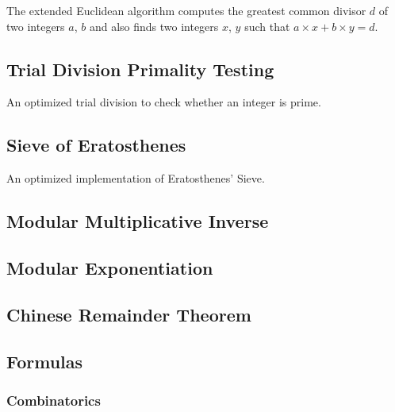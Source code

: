 \documentclass[8pt,a4paper]{amsart}
\begin{document}
The extended Euclidean algorithm computes the greatest common divisor $d$ of two integers $a$, $b$ and also finds two integers $x$, $y$ such that $a\times x + b\times y = d$.


\subsection{Trial Division Primality Testing}
An optimized trial division to check whether an integer is prime.


\subsection{Sieve of Eratosthenes}
An optimized implementation of Eratosthenes' Sieve.


\subsection{Modular Multiplicative Inverse}


\subsection{Modular Exponentiation}


\subsection{Chinese Remainder Theorem}


\subsection{Formulas}

\subsubsection{Combinatorics}
\end{document}
